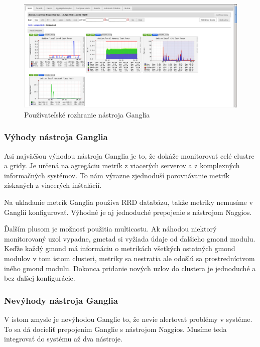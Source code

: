 \documentclass[a4paper, usesections, upjsfrontpage, thesismargins, thesislinespacing, twoside]{rnthesissvk}
\begin{document}
\begin{figure}
	\begin{center}
		\includegraphics[scale=0.41]{ganglia.png}
	\end{center}
	\caption{Používateľské rozhranie nástroja Ganglia}
\end{figure}

\subsubsection{Výhody nástroja Ganglia}

Asi najväčšou výhodou nástroja Ganglia je to, že dokáže monitorovať celé clustre a gridy.
Je určená na agregáciu metrík z viacerých serverov a z komplexných informačných systémov.
To nám výrazne zjednoduší porovnávanie metrík získaných z viacerých inštalácií.

Na ukladanie metrík Ganglia používa RRD databázu, takže metriky nemusíme v Ganglii konfigurovať.
Výhodné je aj jednoduché prepojenie s nástrojom Naggios.

Ďalším plusom je možnosť použitia multicastu.
Ak náhodou niektorý monitorovaný uzol vypadne, gmetad si vyžiada údaje od ďalšieho gmond modulu.
Keďže každý gmond má informáciu o metrikách všetkých ostatných gmond modulov v tom istom clusteri,
metriky sa nestratia ale odošlú sa prostredníctvom iného gmond modulu. 
Dokonca pridanie nových uzlov do clustera je jednoduché a bez ďalšej konfigurácie.

\subsubsection{Nevýhody nástroja Ganglia}

V istom zmysle je nevýhodou Ganglie to, že nevie alertovať problémy v systéme.
To sa dá docieliť prepojením Ganglie s nástrojom Naggios.
Musíme teda integrovať do systému až dva nástroje.
\end{document}
